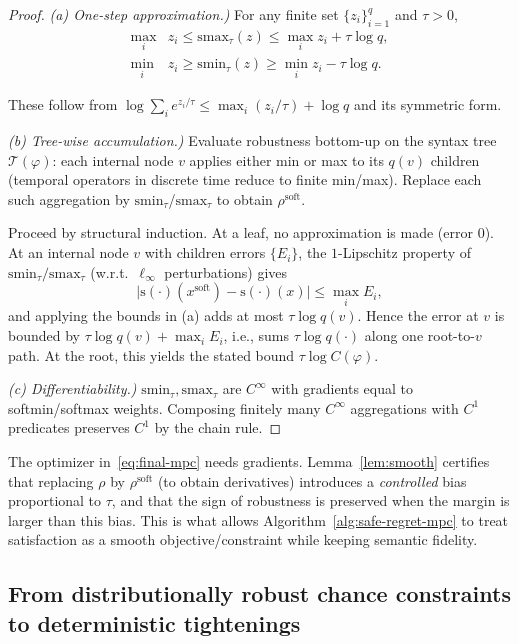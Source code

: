 \documentclass[journal]{IEEEtran}
\theoremstyle{definition}
\begin{document}
\begin{proof}[Proof]
\textit{(a) One-step approximation.)}
For any finite set $\{z_i\}_{i=1}^{q}$ and $\tau>0$,
\begin{align*}
\max_i & z_i \le \mathrm{smax}_\tau(z) \le \max_i z_i + \tau\log q,\\
\min_i & z_i \ge \mathrm{smin}_\tau(z) \ge \min_i z_i - \tau\log q.
\end{align*}
 
These follow from $\log\!\sum_i e^{z_i/\tau}\le \max_i(z_i/\tau)+\log q$ and its symmetric form.

\textit{(b) Tree-wise accumulation.)}
Evaluate robustness bottom-up on the syntax tree $\mathcal{T}(\varphi)$: each internal node $v$ applies
either min or max to its $q(v)$ children (temporal operators in discrete time reduce to finite min/max).
Replace each such aggregation by $\mathrm{smin}_\tau$/$\mathrm{smax}_\tau$ to obtain $\rho^{\mathrm{soft}}$.

Proceed by structural induction. At a leaf, no approximation is made (error $0$).
At an internal node $v$ with children errors $\{E_i\}$, the $1$-Lipschitz property of
$\mathrm{smin}_\tau/\mathrm{smax}_\tau$ (w.r.t.\ $\ell_\infty$ perturbations) gives
\[
\big|\mathrm{s(\cdot)}(x^{\mathrm{soft}})-\mathrm{s(\cdot)}(x)\big|\le \max_i E_i,
\]
and applying the bounds in (a) adds at most $\tau\log q(v)$. Hence the error at $v$ is bounded by
$\tau\log q(v)+\max_i E_i$, i.e., sums $\tau\log q(\cdot)$ along one root-to-$v$ path. At the root,
this yields the stated bound $\tau\log C(\varphi)$.

\textit{(c) Differentiability.)}
$\mathrm{smin}_\tau,\mathrm{smax}_\tau$ are $C^\infty$ with gradients equal to softmin/softmax weights.
Composing finitely many $C^\infty$ aggregations with $C^1$ predicates preserves $C^1$ by the chain rule.
\end{proof}


The optimizer in~\eqref{eq:final-mpc} needs gradients. Lemma~\ref{lem:smooth} certifies that replacing $\rho$ by $\rho^{\mathrm{soft}}$ (to obtain derivatives) introduces a \emph{controlled} bias proportional to $\tau$, and that the sign of robustness is preserved when the margin is larger than this bias. This is what allows Algorithm~\ref{alg:safe-regret-mpc} to treat satisfaction as a smooth objective/constraint while keeping semantic fidelity.
\subsection{From distributionally robust chance constraints to deterministic tightenings}
\end{document}
